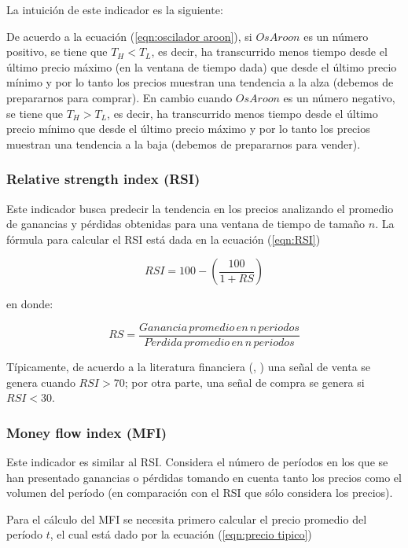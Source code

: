 \documentclass[12pt]{report}
\theoremstyle{break}
\theoremstyle{break}
\begin{document}
La intuición de este indicador es la siguiente:

De acuerdo a la ecuación (\ref{eqn:oscilador aroon}), si $OsAroon$ es un número positivo, se tiene que $T_{H} < T_{L}$, es decir, ha transcurrido menos tiempo desde el último precio máximo (en la ventana de tiempo dada) que desde el último precio mínimo y por lo tanto los precios muestran una tendencia a la alza (debemos de prepararnos para comprar). En cambio cuando $OsAroon$ es un número negativo, se tiene que $T_{H} > T_{L}$, es decir, ha transcurrido menos tiempo desde el último precio mínimo que desde el último precio máximo y por lo tanto los precios muestran una tendencia a la baja (debemos de prepararnos para vender).

\subsubsection{Relative strength index (RSI)}
\label{subsubseccion:RSI}
Este indicador busca predecir la tendencia en los precios analizando el promedio de ganancias y pérdidas obtenidas para una ventana de tiempo de tamaño $n$. La fórmula para calcular el RSI está dada en la ecuación (\ref{eqn:RSI})

\begin{equation} \label{eqn:RSI}
RSI = 100 - \left( \frac{100}{1 + RS} \right)
\end{equation}

en donde:

\begin{equation} \label{eqn:RSI RS}
RS = \frac{Ganancia\,promedio\,en\,n\,periodos}{P\acute{e}rdida\,promedio\,en\,n\,periodos}
\end{equation}

Típicamente, de acuerdo a la literatura financiera (\cite{technicalAnalysisKirkPatrick}, \cite{encycoplediaTechnicalIndicators}) una señal de venta se genera cuando $RSI > 70$; por otra parte, una señal de compra se genera si $RSI < 30$.

\subsubsection{Money flow index (MFI)}
\label{subsubseccion:money flow index}
Este indicador es similar al RSI. Considera el número de períodos en los que se han presentado ganancias o pérdidas tomando en cuenta tanto los precios como el volumen del período (en comparación con el RSI que sólo considera los precios).

Para el cálculo del MFI se necesita primero calcular el precio promedio del período $t$, el cual está dado por la ecuación (\ref{eqn:precio tipico})
\end{document}
